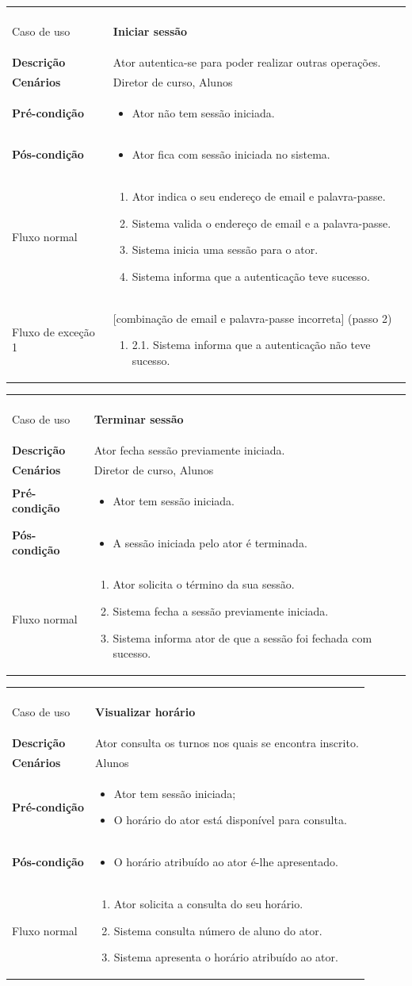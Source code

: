 \documentclass[12pt, a4paper]{article}
\newenvironment{condition}{
    \begin{itemize}[wide=0pt]
        \vspace{-0.2cm}
}{
        \vspace{-0.5cm}
    \end{itemize}
}
\newcommand\flow[1]{
    Fluxo normal &
    \vspace{-0.9cm}
    \singlespacing
    \begin{enumerate}[wide=0pt]
        #1
        \vspace{-0.3cm}
    \end{enumerate} \\ \hline
}
\newcommand\otherflow[3]{
    #1 &
    #2
    \singlespacing
    \begin{enumerate}[wide=0pt]
        #3
        \vspace{-0.3cm}
    \end{enumerate} \\ \hline
}
\newenvironment{usecase}[5]{
    \begin{longtable}{|>{\centering\arraybackslash\bf}m{3cm}|m{13cm}|}
        \multicolumn{2}{c}{\ldots Continua \ldots} \\
        \endfoot
        \endlastfoot

        \hline
        Caso de uso & \textbf{#1} \\

        \hline
        Descrição & #2 \\

        \hline
        Cenários & #3 \\

        \hline
        Pré-condição &
        \vspace{-0.8cm}
        \begin{condition}
            #4
        \end{condition} \\

        \hline
        Pós-condição &
        \vspace{-0.8cm}
        \begin{condition}
            #5
        \end{condition} \\

        \hline
}{
\end{longtable}
}
\begin{document}
\begin{usecase}
    {Iniciar sessão}
    {Ator autentica-se para poder realizar outras operações.}
    {Diretor de curso, Alunos}
    {\item Ator não tem sessão iniciada.}
    {\item Ator fica com sessão iniciada no sistema.}

    \flow{
        \item Ator indica o seu endereço de email e palavra-passe.
        \item Sistema valida o endereço de email e a palavra-passe.
        \item Sistema inicia uma sessão para o ator.
        \item Sistema informa que a autenticação teve sucesso.
    }

    \otherflow{Fluxo de exceção 1}{[combinação de email e palavra-passe incorreta] (passo 2)}{
        \item[2.1.] Sistema informa que a autenticação não teve sucesso.
    }
\end{usecase}

\begin{usecase}
    {Terminar sessão}
    {Ator fecha sessão previamente iniciada.}
    {Diretor de curso, Alunos}
    {\item Ator tem sessão iniciada.}
    {\item A sessão iniciada pelo ator é terminada.}

    \flow{
        \item Ator solicita o término da sua sessão.
        \item Sistema fecha a sessão previamente iniciada.
        \item Sistema informa ator de que a sessão foi fechada com sucesso.
    }
\end{usecase}

\begin{usecase}
    {Visualizar horário}
    {Ator consulta os turnos nos quais se encontra inscrito.}
    {Alunos}
    {
        \item Ator tem sessão iniciada;
        \item O horário do ator está disponível para consulta.
    }
    {\item O horário atribuído ao ator é-lhe apresentado.}

    \flow{
        \item Ator solicita a consulta do seu horário.
        \item Sistema consulta número de aluno do ator.
        \item Sistema apresenta o horário atribuído ao ator.
    }
\end{usecase}
\end{document}
